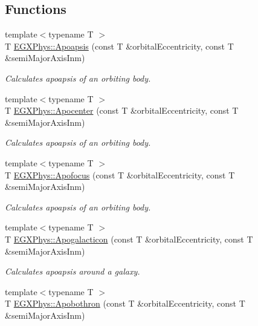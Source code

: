 \subsection*{Functions}
\begin{DoxyCompactItemize}
\item 
{\footnotesize template$<$typename T $>$ }\\T \mbox{\hyperlink{group___e_g_x_phys-_apoapsis_gafd08a2d1d64886e7bb9bcb7ff65bc3ea}{E\+G\+X\+Phys\+::\+Apoapsis}} (const T \&orbital\+Eccentricity, const T \&semi\+Major\+Axis\+Inm)
\begin{DoxyCompactList}\small\item\em Calculates apoapsis of an orbiting body. \end{DoxyCompactList}\item 
{\footnotesize template$<$typename T $>$ }\\T \mbox{\hyperlink{group___e_g_x_phys-_apoapsis_gaacffba78614c5b4d5488d8e9b8c661ee}{E\+G\+X\+Phys\+::\+Apocenter}} (const T \&orbital\+Eccentricity, const T \&semi\+Major\+Axis\+Inm)
\begin{DoxyCompactList}\small\item\em Calculates apoapsis of an orbiting body. \end{DoxyCompactList}\item 
{\footnotesize template$<$typename T $>$ }\\T \mbox{\hyperlink{group___e_g_x_phys-_apoapsis_gada28ef9258703e9e32ac9e564544ae87}{E\+G\+X\+Phys\+::\+Apofocus}} (const T \&orbital\+Eccentricity, const T \&semi\+Major\+Axis\+Inm)
\begin{DoxyCompactList}\small\item\em Calculates apoapsis of an orbiting body. \end{DoxyCompactList}\item 
{\footnotesize template$<$typename T $>$ }\\T \mbox{\hyperlink{group___e_g_x_phys-_apoapsis_gafef7ad033b39c29cdfe624cd48a6d616}{E\+G\+X\+Phys\+::\+Apogalacticon}} (const T \&orbital\+Eccentricity, const T \&semi\+Major\+Axis\+Inm)
\begin{DoxyCompactList}\small\item\em Calculates apoapsis around a galaxy. \end{DoxyCompactList}\item 
{\footnotesize template$<$typename T $>$ }\\T \mbox{\hyperlink{group___e_g_x_phys-_apoapsis_ga95add3a7ff4e799bff0a508c9bdaa408}{E\+G\+X\+Phys\+::\+Apobothron}} (const T \&orbital\+Eccentricity, const T \&semi\+Major\+Axis\+Inm)

\end{DoxyCompactItemize}
